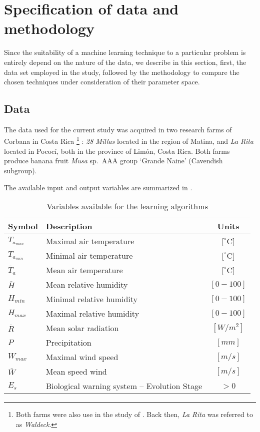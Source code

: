\section{Specification of data and methodology}
\label{sec:data}

Since the suitability of a machine learning technique to a particular
problem is entirely depend on the nature of the data, we describe in
this section, first, the data set employed in the study, followed by
the methodology to compare the chosen techniques under consideration
of their parameter space.

\subsection{Data}

The data used for the current study was acquired in two research farms
of Corbana in Costa Rica%
%
\footnote{Both farms were also use in the study of \citet{Romero1995}.  Back
  then, \emph{La Rita} was referred to as \emph{Waldeck}.}
%
: \emph{28 Millas} located in the region of Matina, and \emph{La Rita}
located in Pococí, both in the province of Limón, Costa Rica.
%
Both farms produce banana fruit \emph{Musa} sp.\ AAA group `Grande
Naine' (Cavendish subgroup). 

The available input and output variables are summarized in
.
%
\begin{table}[h] 
\centering
\begin{tabular}{l|l|c} 
\hline
\textbf{Symbol}  & \textbf{Description} & \textbf{Units} \\ 
\hline\hline 
$T_{a_{max}}$       & Maximal air temperature & $[^\circ$C$]$ \\
$T_{a_{min}}$       & Minimal air temperature & $[^\circ$C$]$ \\
$\overline{T}_{a}$ & Mean air temperature    & $[^\circ$C$]$ \\
$\overline{H}$    & Mean relative humidity           & $[0 - 100]$   \\
$H_{min}$          & Minimal relative humidity        & $[0 - 100]$  \\
$H_{max}$          & Maximal relative humidity        & $[0 - 100]$  \\
$\overline{R}$    & Mean solar radiation    & $[W/m^2]$ \\
$P$               & Precipitation       & $[mm]$ \\
$W_{max}$          & Maximal wind speed      & $[m/s]$ \\
$\overline{W}$    & Mean speed wind         & $[m/s]$ \\
\hline
$E_s$             & Biological warning system – Evolution Stage  & $>0$\\
\hline
\end{tabular} 
\caption{Variables available for the learning algorithms} 
\label{tab:variables} 
\end{table}


